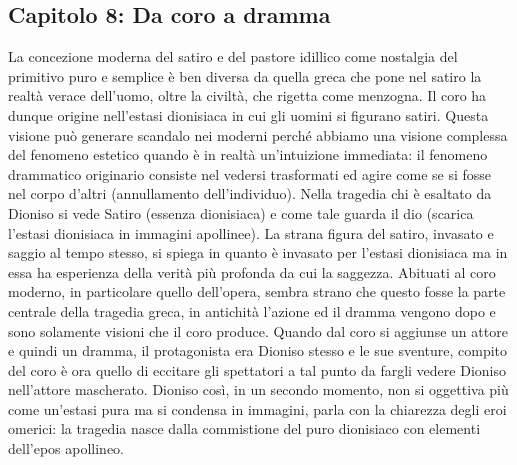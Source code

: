 \documentclass[10pt,a4paper]{article}
\begin{document}
\subsection{Capitolo 8: Da coro a dramma}
La concezione moderna del satiro e del pastore idillico come nostalgia del primitivo puro e semplice è ben diversa da quella greca che pone nel satiro la realtà verace dell'uomo, oltre la civiltà, che rigetta come menzogna. Il coro ha dunque origine nell'estasi dionisiaca in cui gli uomini si figurano satiri. Questa visione può generare scandalo nei moderni perché abbiamo una visione complessa del fenomeno estetico quando è in realtà un'intuizione immediata: il fenomeno drammatico originario consiste nel vedersi trasformati ed agire come se si fosse nel corpo d'altri (annullamento dell'individuo). Nella tragedia chi è esaltato da Dioniso si vede Satiro (essenza dionisiaca) e come tale guarda il dio (scarica l'estasi dionisiaca in immagini apollinee). La strana figura del satiro, invasato e saggio al tempo stesso, si spiega in quanto è invasato per l'estasi dionisiaca ma in essa ha esperienza della verità più profonda da cui la saggezza.  Abituati al coro moderno, in particolare quello dell'opera, sembra strano che questo fosse la parte centrale della tragedia greca, in antichità l'azione ed il dramma vengono dopo e sono solamente visioni che il coro produce. Quando dal coro si aggiunse un attore e quindi un dramma, il protagonista era Dioniso stesso e le sue sventure, compito del coro è ora quello di eccitare gli spettatori a tal punto da fargli vedere Dioniso nell'attore mascherato. Dioniso così, in un secondo momento, non si oggettiva più come un'estasi pura ma si condensa in immagini, parla con la chiarezza degli eroi omerici: la tragedia nasce dalla commistione del puro dionisiaco con elementi dell'epos apollineo.  
\end{document}
